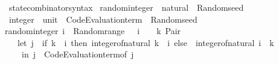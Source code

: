 \begin{isabellebody}
\isanewline
{}\isamarkupfalse%
\isanewline
\ \ \ state{\isacharunderscore}{\kern0pt}combinator{\isacharunderscore}{\kern0pt}syntax\isanewline
{}\isanewline
\isanewline
{}\isamarkupfalse%
\ random{\isacharunderscore}{\kern0pt}integer\ {\isacharcolon}{\kern0pt}{\isacharcolon}{\kern0pt}\ {\isachardoublequoteopen}natural\ {\isasymRightarrow}\ Random{\isachardot}{\kern0pt}seed\isanewline
\ \ {\isasymRightarrow}\ {\isacharparenleft}{\kern0pt}integer\ {\isasymtimes}\ {\isacharparenleft}{\kern0pt}unit\ {\isasymRightarrow}\ Code{\isacharunderscore}{\kern0pt}Evaluation{\isachardot}{\kern0pt}term{\isacharparenright}{\kern0pt}{\isacharparenright}{\kern0pt}\ {\isasymtimes}\ Random{\isachardot}{\kern0pt}seed{\isachardoublequoteclose}\isanewline
{}\isanewline
\ \ {\isachardoublequoteopen}random{\isacharunderscore}{\kern0pt}integer\ i\ {\isacharequal}{\kern0pt}\ Random{\isachardot}{\kern0pt}range\ {\isacharparenleft}{\kern0pt}{}\ {\isacharasterisk}{\kern0pt}\ i\ {\isacharplus}{\kern0pt}\ {}{\isacharparenright}{\kern0pt}\ {\isasymcirc}{\isasymrightarrow}\ {\isacharparenleft}{\kern0pt}{\isasymlambda}k{\isachardot}{\kern0pt}\ Pair\ {\isacharparenleft}{\kern0pt}\isanewline
\ \ \ \ \ let\ j\ {\isacharequal}{\kern0pt}\ {\isacharparenleft}{\kern0pt}if\ k\ {\isasymge}\ i\ then\ integer{\isacharunderscore}{\kern0pt}of{\isacharunderscore}{\kern0pt}natural\ {\isacharparenleft}{\kern0pt}k\ {\isacharminus}{\kern0pt}\ i{\isacharparenright}{\kern0pt}\ else\ {\isacharminus}{\kern0pt}\ {\isacharparenleft}{\kern0pt}integer{\isacharunderscore}{\kern0pt}of{\isacharunderscore}{\kern0pt}natural\ {\isacharparenleft}{\kern0pt}i\ {\isacharminus}{\kern0pt}\ k{\isacharparenright}{\kern0pt}{\isacharparenright}{\kern0pt}{\isacharparenright}{\kern0pt}\isanewline
\ \ \ \ \ \ in\ {\isacharparenleft}{\kern0pt}j{\isacharcomma}{\kern0pt}\ {\isasymlambda}{\isacharunderscore}{\kern0pt}{\isachardot}{\kern0pt}\ Code{\isacharunderscore}{\kern0pt}Evaluation{\isachardot}{\kern0pt}term{\isacharunderscore}{\kern0pt}of\ j{\isacharparenright}{\kern0pt}{\isacharparenright}{\kern0pt}{\isacharparenright}{\kern0pt}{\isachardoublequoteclose}\isanewline
\isanewline
{}\isamarkupfalse%
%
\isadelimproof
\ %
\endisadelimproof
%
\isatagproof
\isacommand{{\isachardot}{\kern0pt}{\isachardot}{\kern0pt}}\isamarkupfalse%
%
\endisatagproof
{\isafoldproof}%
%
\isadelimproof
%
\endisadelimproof
\isanewline
\isanewline
{}\isamarkupfalse%
\isanewline
\isanewline
{}\isamarkupfalse%

\end{isabellebody}

